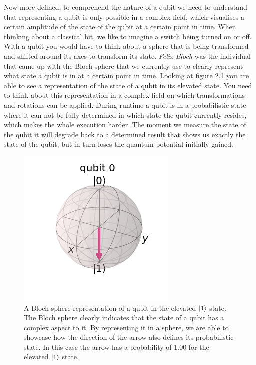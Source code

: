 Now more defined, to comprehend the nature of a qubit we need to understand that representing a qubit is only possible in a complex field, which visualises a certain amplitude of the state of the qubit at a certain point in time. When thinking about a classical bit, we like to imagine a switch being turned on or off. With a qubit you would have to think about a sphere that is being transformed and shifted around its axes to transform its state. \textit{Felix Bloch} was the individual that came up with the Bloch sphere that we currently use to clearly represent what state a qubit is in at a certain point in time. Looking at figure 2.1 you are able to see a representation of the state of a qubit in its elevated state. You need to think about this representation in a complex field on which transformations and rotations can be applied.
During runtime a qubit is in a probabilistic state where it can not be fully determined in which state the qubit currently resides, which makes the whole execution harder. The moment we measure the state of the qubit it will degrade back to a determined result that shows us exactly the state of the qubit, but in turn loses the quantum potential initially gained.

\begin{figure}[h]
	\centering
	\includegraphics[scale = 0.75]{../Demonstration/img/Quantum_essentials_1.PNG}
	\caption{A Bloch sphere representation of a qubit in the elevated $\ket{1}$ state. 
		The Bloch sphere clearly indicates that the state of a qubit has a complex aspect to it. By representing it in a sphere, we are able to showcase how the direction of the arrow also defines its probabilistic state. In this case the arrow has a probability of 1.00 for the elevated $\ket{1}$ state.}
\end{figure}

